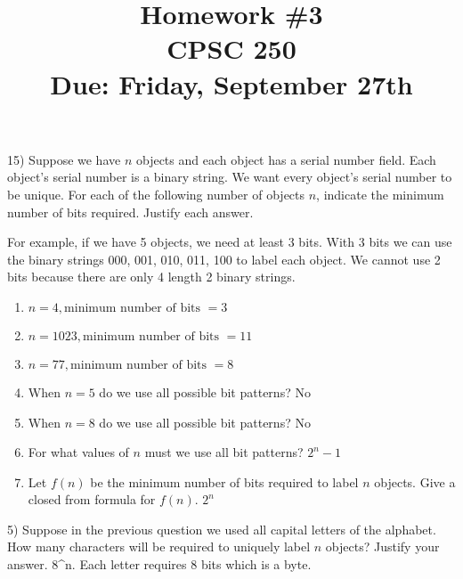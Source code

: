 \documentclass[12pt]{article}
\newenvironment{problem}[2][Problem]{\begin{trivlist}
\item[\hskip \labelsep {\bfseries #1}\hskip \labelsep {\bfseries #2.}]}{\end{trivlist}}
\begin{document}

\title{Homework \#3 \\ CPSC 250 \\ Due: Friday, September 27th \\ }%
\date{}

\maketitle



\begin{problem}{1}(15)
Suppose we have $n$ objects and each object has a serial number field. Each object's serial 
number is a binary string. We want every object's serial number to be unique. For each of the 
following number of objects $n$, indicate the minimum number of bits required. Justify each 
answer.

For example, if we have 5 objects, we need at least 3 bits. With 3 bits we can use the binary 
strings 000, 001, 010, 011, 100 to label each object. We cannot use 2 bits because there are only 4 length 2 binary strings.

\begin{enumerate}
 \item $n = 4, \textrm{minimum number of bits } = 3$
 \item $n = 1023, \textrm{minimum number of bits } = 11$
 \item $n = 77, \textrm{minimum number of bits } = 8$
 \item When $n = 5$ do we use all possible bit patterns? No
 \item When $n = 8$ do we use all possible bit patterns? No
 \item For what values of $n$ must we use all bit patterns? $2^n - 1$
 \item Let $f(n)$ be the minimum number of bits required to label $n$ objects. Give a closed
 from formula for $f(n)$. $2^n$
\end{enumerate}
\end{problem}

\begin{problem}{2}(5)
 Suppose in the previous question we used all capital letters of the alphabet. How many 
 characters will be required to uniquely label $n$ objects? Justify your answer. 8^n. Each letter requires 8 bits which is a byte.
\end{problem}
\end{document}
